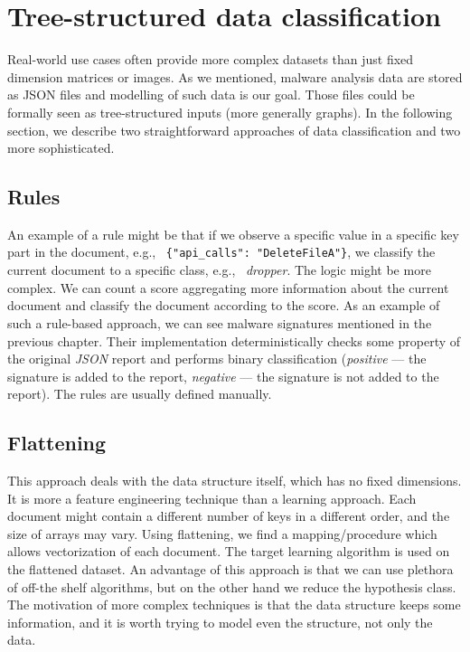 \section{Tree-structured data classification}
Real-world use cases often provide more complex datasets than just fixed dimension matrices or images. As we mentioned, malware analysis data are stored as JSON files and modelling of such data is our goal. Those files could be formally seen as tree-structured inputs (more generally graphs). In the following section, we describe two straightforward approaches of data classification and two more sophisticated.

\subsection{Rules}
An example of a rule might be that if we observe a specific value in a specific key part in the document, e.g., \ \lstinline|{"api_calls": "DeleteFileA"}|, we classify the current document to a specific class, e.g., \ \emph{dropper}. The logic might be more complex. We can count a score aggregating more information about the current document and classify the document according to the score. As an example of such a rule-based approach, we can see malware signatures mentioned in the previous chapter. Their implementation deterministically checks some property of the original \emph{JSON} report and performs binary classification (\emph{positive} --- the signature is added to the report, \emph{negative} --- the signature is not added to the report). The rules are usually defined manually.

\subsection{Flattening}
This approach deals with the data structure itself, which has no fixed dimensions. It is more a feature engineering technique than a learning approach. Each document might contain a different number of keys in a different order, and the size of arrays may vary. Using flattening, we find a mapping/procedure which allows vectorization of each document. The target learning algorithm is used on the flattened dataset. An advantage of this approach is that we can use plethora of off-the shelf algorithms, but on the other hand we reduce the hypothesis class.
\hfill \break
The motivation of more complex techniques is that the data structure keeps some information, and it is worth trying to model even the structure, not only the data.


